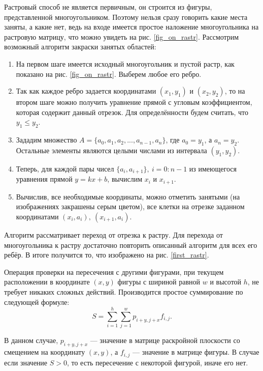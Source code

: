 \documentclass[14pt]{extarticle}
\begin{document}
	Растровый способ не является первичным, он строится из фигуры, представленной многоугольником.
	Поэтому нельзя сразу говорить какие места заняты, а какие нет, ведь на входе имеется простое наложение многоугольника на растровую матрицу, что можно увидеть на рис. \ref{fig_on_rastr}.
	Рассмотрим возможный алгоритм закраски занятых областей:
	\begin{enumerate}
		\item На первом шаге имеется исходный многоугольник и пустой растр, как показано на рис. \ref{fig_on_rastr}. Выберем любое его ребро.
		\item Так как каждое ребро задается координатами $(x_1 , y_1 )$ и $(x_2 , y_2 )$, то на втором шаге можно получить уравнение прямой с угловым коэффициентом, которая содержит данный
		отрезок. Для определённости будем считать, что $y_1 \leq y_2$.
		\item Зададим множество $A=\{a_0, a_1, a_2, ..., a_{n-1}, a_n\}$, где $a_0=y_1$, а $a_n = y_2$. Остальные элементы являются целыми числами из интервала $(y_1, y_2)$.  
		\item Теперь, для каждой пары чисел $\{a_i, a_{i+1}\},\ i = 0:n-1$ из имеющегося уравнения прямой $y=kx+b$, вычислим $x_i$ и $x_{i+1}$.
		\item Вычислив, все необходимые координаты, можно отметить занятыми (на изображениях закрашены серым цветом), все клетки на отрезке заданном координатами $(x_i, a_i),\ (x_{i+1}, a_i)$.
	\end{enumerate}
	\begin{multicols}{1}
		
		
	\end{multicols}

	Алгоритм рассматривает переход от отрезка к растру. Для перехода от многоугольника к растру достаточно повторить описанный алгоритм для всех его ребёр. В итоге получится то, что изображено на рис. \ref{first_rastr}.
	


	Операция проверки на пересечения с другими фигурами, при текущем расположении в координате $(x, y)$ фигуры с шириной равной $w$ и высотой $h$, не требует никаких сложных действий. Производится простое суммирование по следующей формуле:
	\begin{equation}
		\label{simple_sum}
		S = \sum_{i=1}^{h}\sum_{j=1}^{w}p_{i+y, j+x}f_{i,j}. 
	\end{equation}


	В данном случае, $p_{i+y,j+x}$ --- значение в матрице раскройной плоскости со смещением на координату $(x, y)$, а $f_{i,j}$ --- значение в матрице фигуры. В случае если значение $S > 0$, то есть пересечение с некоторой фигурой, иначе его нет.
\end{document}

